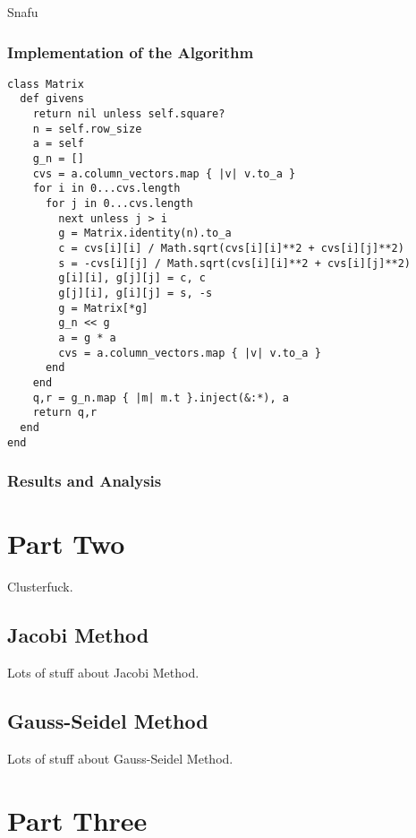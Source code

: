 \documentclass[letterpaper,12pt]{article}
\begin{document}
Snafu

\subsubsection{Implementation of the Algorithm}

\lstset{caption=QR Decomposition via Givens Rotations}
\begin{lstlisting}
class Matrix
  def givens
    return nil unless self.square?
    n = self.row_size
    a = self
    g_n = []
    cvs = a.column_vectors.map { |v| v.to_a }
    for i in 0...cvs.length
      for j in 0...cvs.length
        next unless j > i
        g = Matrix.identity(n).to_a
        c = cvs[i][i] / Math.sqrt(cvs[i][i]**2 + cvs[i][j]**2)
        s = -cvs[i][j] / Math.sqrt(cvs[i][i]**2 + cvs[i][j]**2)
        g[i][i], g[j][j] = c, c
        g[j][i], g[i][j] = s, -s
        g = Matrix[*g]
        g_n << g
        a = g * a
        cvs = a.column_vectors.map { |v| v.to_a }
      end
    end
    q,r = g_n.map { |m| m.t }.inject(&:*), a
    return q,r
  end
end
\end{lstlisting}

\subsubsection{Results and Analysis}

\newpage
\section{Part Two}


Clusterfuck.

\subsection{Jacobi Method}

Lots of stuff about Jacobi Method.

\subsection{Gauss-Seidel Method}

Lots of stuff about Gauss-Seidel Method.

\newpage
\section{Part Three}
\end{document}
